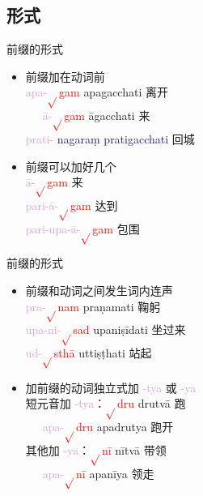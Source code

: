 \documentclass[17pt]{beamer}
\newcommand{\verbroot}[1]{\textcolor{red}{$\sqrt{}$#1}}
\newcommand{\fullpada}[1]{\textcolor{OliveGreen}{#1}}
\newcommand{\pratyaya}[1]{\textcolor{Plum}{#1}}
\newcommand{\fullsentence}[1]{\textcolor{MidnightBlue}{#1}}
\begin{document}
\subsection{形式}
\begin{frame}{前缀的形式}
  \begin{itemize}
    \item 前缀加在动词前 \\
    \pratyaya{apa\nobreakdash-}\verbroot{gam}   \fullpada{apagacchati} 离开 \\
    ~~~\pratyaya{ā\nobreakdash-}\verbroot{gam}  \fullpada{āgacchati} 来 \\
    \pratyaya{prati\nobreakdash-}  \fullsentence{nagaraṃ pratigacchati} 回城 \\

    \item 前缀可以加好几个 \\   
    \pratyaya{ā\nobreakdash-}\verbroot{gam} 来  \\
    \pratyaya{pari\nobreakdash-ā\nobreakdash-}\verbroot{gam} 达到 \\
    \pratyaya{pari\nobreakdash-upa\nobreakdash-ā\nobreakdash-}\verbroot{gam} 包围 \\
  \end{itemize}
\end{frame}

\begin{frame}{前缀的形式}
  \begin{itemize}
    \item 前缀和动词之间发生词内连声 \\
    \pratyaya{pra\nobreakdash-}\verbroot{nam}   \fullpada{praṇamati} 鞠躬 \\
    \pratyaya{upa\nobreakdash-ni\nobreakdash-}\verbroot{sad}  \fullpada{upaniṣīdati} 坐过来 \\
    \pratyaya{ud\nobreakdash-}\verbroot{sthā}  \fullpada{uttiṣṭhati} 站起 \\
    \item 加前缀的动词独立式加 \pratyaya{\nobreakdash-tya} 或 \pratyaya{\nobreakdash-ya} \\   
    短元音加 \pratyaya{\nobreakdash-tya}：\verbroot{dru} \fullpada{drutvā} 跑 \\
    ~~~\pratyaya{apa\nobreakdash-}\verbroot{dru} \fullpada{apadrutya} 跑开 \\
    其他加 \pratyaya{\nobreakdash-ya}：\verbroot{nī} \fullpada{nītvā} 带领 \\
    ~~~\pratyaya{apa\nobreakdash-}\verbroot{nī} \fullpada{apanīya} 领走 \\
  \end{itemize}
\end{frame}
\end{document}
